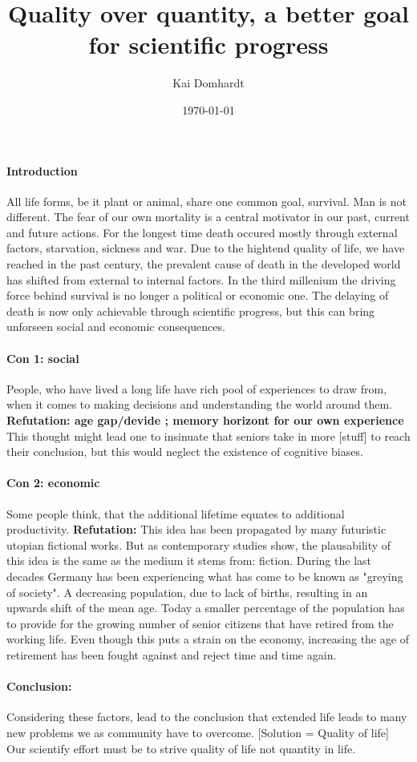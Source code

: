 \documentclass[12pt]{scrartcl}
\title{Quality over quantity, a better goal for scientific progress}
\author{Kai Domhardt}
\date{\today}
\begin{document}
\maketitle

\paragraph{Introduction}
All life forms, be it plant or animal, share one common goal, survival. Man is not different. The fear of our own mortality is a central motivator in our past, current and future actions. For the longest time death occured mostly through external factors, starvation, sickness and war. Due to the hightend quality of life, we have reached in the past century, the prevalent cause of death in the developed world has shifted from external to internal factors. In the third millenium the driving force behind survival is no longer a political or economic one. The delaying of death is now only achievable through scientific progress, but this can bring unforseen social and economic consequences.


\paragraph{Con 1: social}
People, who have lived a long life have rich pool of experiences to draw from, when it comes to making decisions and understanding the world around them.
\textbf{Refutation: age gap/devide ; memory horizont for our own experience}
This thought might lead one to insinuate that seniors take in more [stuff] to reach their conclusion, but this would neglect the existence of cognitive biases.


\paragraph{Con 2: economic}
Some people think, that the additional lifetime equates to additional productivity. 
\textbf{Refutation:}
This idea has been propagated by many futuristic utopian fictional works. But as contemporary studies show, the plausability of this idea is the same as the medium it stems from: fiction. During the last decades Germany has been experiencing what has come to be known as "greying of society". A decreasing population, due to lack of births, resulting in an upwards shift of the mean age. Today a smaller percentage of the population has to provide for the growing number of senior citizens that have retired from the working life. Even though this puts a strain on the economy, increasing the age of retirement has been fought against and reject time and time again.

\paragraph{Conclusion:}
Considering these factors, lead to the conclusion that extended life leads to many new problems we as community have to overcome.
[Solution = Quality of life]
Our scientify effort must be to strive quality of life not quantity in life.
\end{document}
